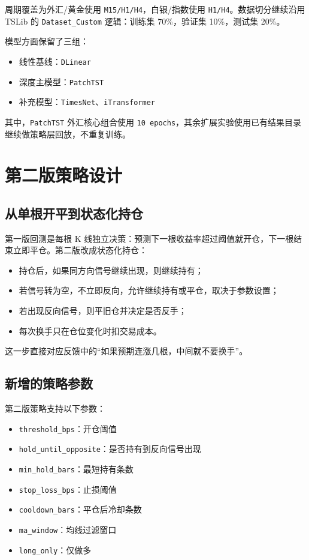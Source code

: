 \documentclass[11pt,a4paper]{ctexart}
\begin{document}
周期覆盖为外汇/黄金使用 \texttt{M15/H1/H4}，白银/指数使用 \texttt{H1/H4}。数据切分继续沿用 TSLib 的 \texttt{Dataset\_Custom} 逻辑：训练集 70\%，验证集 10\%，测试集 20\%。

模型方面保留了三组：
\begin{itemize}
  \item 线性基线：\texttt{DLinear}
  \item 深度主模型：\texttt{PatchTST}
  \item 补充模型：\texttt{TimesNet}、\texttt{iTransformer}
\end{itemize}

其中，\texttt{PatchTST} 外汇核心组合使用 \texttt{10 epochs}，其余扩展实验使用已有结果目录继续做策略层回放，不重复训练。

\section{第二版策略设计}

\subsection{从单根开平到状态化持仓}

第一版回测是每根 K 线独立决策：预测下一根收益率超过阈值就开仓，下一根结束立即平仓。第二版改成状态化持仓：
\begin{itemize}
  \item 持仓后，如果同方向信号继续出现，则继续持有；
  \item 若信号转为空，不立即反向，允许继续持有或平仓，取决于参数设置；
  \item 若出现反向信号，则平旧仓并决定是否反手；
  \item 每次换手只在仓位变化时扣交易成本。
\end{itemize}

这一步直接对应反馈中的“如果预期连涨几根，中间就不要换手”。

\subsection{新增的策略参数}

第二版策略支持以下参数：
\begin{itemize}
  \item \texttt{threshold\_bps}：开仓阈值
  \item \texttt{hold\_until\_opposite}：是否持有到反向信号出现
  \item \texttt{min\_hold\_bars}：最短持有条数
  \item \texttt{stop\_loss\_bps}：止损阈值
  \item \texttt{cooldown\_bars}：平仓后冷却条数
  \item \texttt{ma\_window}：均线过滤窗口
  \item \texttt{long\_only}：仅做多
\end{itemize}
\end{document}
